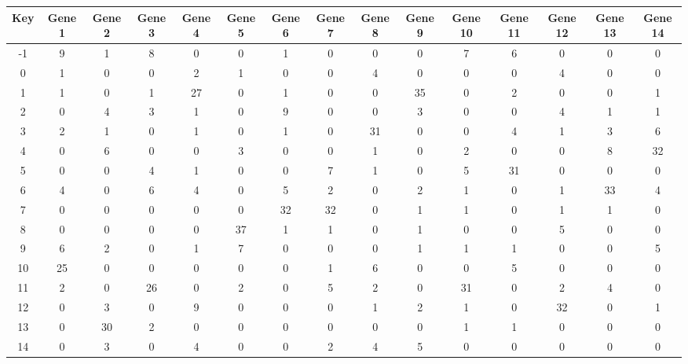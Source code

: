\begin{tabular}{|c|c|c|c|c|c|c|c|c|c|c|c|c|c|c|}
\hline
Key & Gene 1 & Gene 2 & Gene 3 & Gene 4 & Gene 5 & Gene 6 & Gene 7 & Gene 8 & Gene 9 & Gene 10 & Gene 11 & Gene 12 & Gene 13 & Gene 14 \\
\hline
-1 & 9 & 1 & 8 & 0 & 0 & 1 & 0 & 0 & 0 & 7 & 6 & 0 & 0 & 0 \\
0 & 1 & 0 & 0 & 2 & 1 & 0 & 0 & 4 & 0 & 0 & 0 & 4 & 0 & 0 \\
1 & 1 & 0 & 1 & 27 & 0 & 1 & 0 & 0 & 35 & 0 & 2 & 0 & 0 & 1 \\
2 & 0 & 4 & 3 & 1 & 0 & 9 & 0 & 0 & 3 & 0 & 0 & 4 & 1 & 1 \\
3 & 2 & 1 & 0 & 1 & 0 & 1 & 0 & 31 & 0 & 0 & 4 & 1 & 3 & 6 \\
4 & 0 & 6 & 0 & 0 & 3 & 0 & 0 & 1 & 0 & 2 & 0 & 0 & 8 & 32 \\
5 & 0 & 0 & 4 & 1 & 0 & 0 & 7 & 1 & 0 & 5 & 31 & 0 & 0 & 0 \\
6 & 4 & 0 & 6 & 4 & 0 & 5 & 2 & 0 & 2 & 1 & 0 & 1 & 33 & 4 \\
7 & 0 & 0 & 0 & 0 & 0 & 32 & 32 & 0 & 1 & 1 & 0 & 1 & 1 & 0 \\
8 & 0 & 0 & 0 & 0 & 37 & 1 & 1 & 0 & 1 & 0 & 0 & 5 & 0 & 0 \\
9 & 6 & 2 & 0 & 1 & 7 & 0 & 0 & 0 & 1 & 1 & 1 & 0 & 0 & 5 \\
10 & 25 & 0 & 0 & 0 & 0 & 0 & 1 & 6 & 0 & 0 & 5 & 0 & 0 & 0 \\
11 & 2 & 0 & 26 & 0 & 2 & 0 & 5 & 2 & 0 & 31 & 0 & 2 & 4 & 0 \\
12 & 0 & 3 & 0 & 9 & 0 & 0 & 0 & 1 & 2 & 1 & 0 & 32 & 0 & 1 \\
13 & 0 & 30 & 2 & 0 & 0 & 0 & 0 & 0 & 0 & 1 & 1 & 0 & 0 & 0 \\
14 & 0 & 3 & 0 & 4 & 0 & 0 & 2 & 4 & 5 & 0 & 0 & 0 & 0 & 0 \\
\hline
\end{tabular}